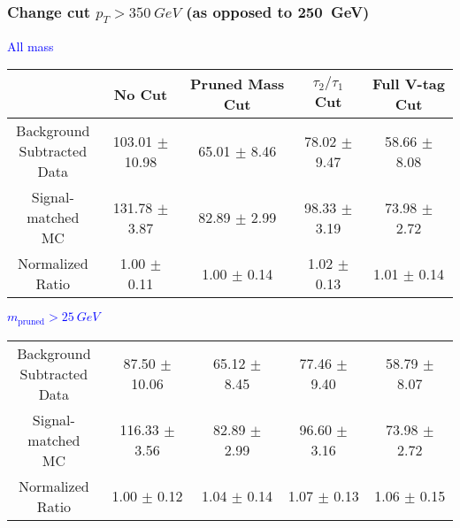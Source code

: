 \documentclass{beamer}
\newcommand{\backupend}{
  \addtocounter{framenumbervorappendix}{-\value{framenumber}}
  \addtocounter{framenumber}{\value{framenumbervorappendix}} 
}
\begin{document}
\begin{frame}
  \frametitle{Change cut $p_T > \SI{350}{GeV}$ (as opposed to \SI{250}{GeV})}
  \begin{adjustwidth}{-1.5em}{-1.5em}
    \centering
    \vspace{6pt}
    \textcolor{blue}{All mass}
    \vspace{6pt}

    {\scriptsize
      \begin{tabular}{c | c | c | c | c}
\hline
 & No Cut & Pruned Mass Cut & $\tau_2/\tau_1$ Cut & Full V-tag Cut \\
\hline
\makecell{Background \\ Subtracted \\ Data} & 103.01 $\pm$ 10.98 & 65.01 $\pm$ 8.46 & 78.02 $\pm$ 9.47 & 58.66 $\pm$ 8.08 \\
\makecell{Signal-\\ matched MC} & 131.78 $\pm$ 3.87 & 82.89 $\pm$ 2.99 & 98.33 $\pm$ 3.19 & 73.98 $\pm$ 2.72 \\
\hline
\makecell{Normalized \\ Ratio} & 1.00 $\pm$ 0.11 & 1.00 $\pm$ 0.14 & 1.02 $\pm$ 0.13 & 1.01 $\pm$ 0.14 \\
\hline
      \end{tabular}
    }

    \vspace{6pt}
    \textcolor{blue}{$m_\text{pruned} > \SI{25}{GeV}$}
    \vspace{6pt}

    {\scriptsize
      \begin{tabular}{c | c | c | c | c}
\hline
\makecell{Background \\ Subtracted \\ Data} & 87.50 $\pm$ 10.06 & 65.12 $\pm$ 8.45 & 77.46 $\pm$ 9.40 & 58.79 $\pm$ 8.07 \\
\makecell{Signal-\\ matched MC} & 116.33 $\pm$ 3.56 & 82.89 $\pm$ 2.99 & 96.60 $\pm$ 3.16 & 73.98 $\pm$ 2.72 \\
\hline
\makecell{Normalized \\ Ratio} & 1.00 $\pm$ 0.12 & 1.04 $\pm$ 0.14 & 1.07 $\pm$ 0.13 & 1.06 $\pm$ 0.15 \\
\hline
      \end{tabular}
    }
  \end{adjustwidth}
\end{frame}



\backupend
\end{document}
